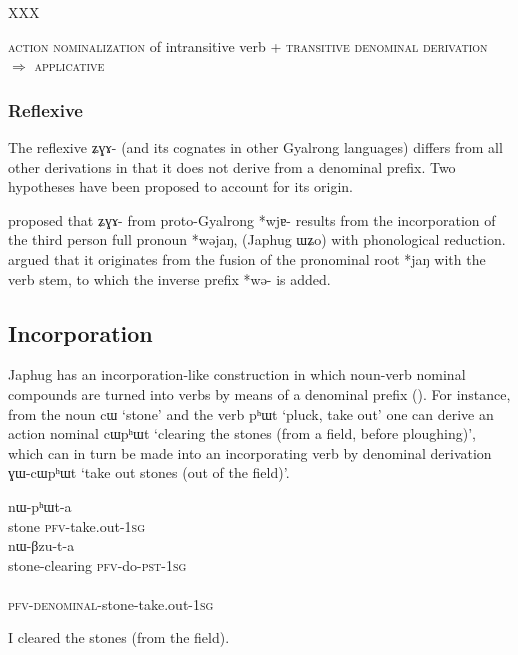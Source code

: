 \documentclass[oldfontcommands,oneside,a4paper,11pt]{article}
\newcommand{\ipa}[1]{{\phon #1}} %
\begin{document}
XXX

\begin{exe}
\ex \label{ex:pathway}
\glt \textsc{action nominalization} of intransitive verb + \textsc{transitive denominal derivation} $\Rightarrow$ \textsc{applicative}
\end{exe}

\subsubsection{Reflexive}
The reflexive \ipa{ʑɣɤ-} (and its cognates in other Gyalrong languages) differs from all other derivations in that it does not derive from a denominal prefix. Two hypotheses have been proposed to account for its origin. 

\citet{jacques10refl} proposed that \ipa{ʑɣɤ-} from proto-Gyalrong *\ipa{wjɐ-} results from the incorporation of the third person full pronoun *\ipa{wəjaŋ}, (Japhug \ipa{ɯʑo}) with phonological reduction. \citet{jackson14morpho} argued that it originates from the fusion of the pronominal root *\ipa{jaŋ} with the verb stem, to which the inverse prefix *\ipa{wə-} is added.


\subsection{Incorporation}
Japhug has an incorporation-like construction in which noun-verb nominal compounds are turned into verbs by means of a denominal prefix (\citealt{jacques12incorp}). For instance, from the noun \ipa{cɯ} `stone' and the verb \ipa{pʰɯt} `pluck, take out' one can derive an action nominal   \ipa{cɯpʰɯt} `clearing the stones (from a field, before ploughing)', which can in turn be made into an incorporating verb by denominal derivation  \ipa{ɣɯ-cɯpʰɯt } `take out stones (out of the field)'. 

\begin{exe}   
\ex
\begin{xlist}[(ii)]
\gll     \ipa{cɯ} \ipa{nɯ-pʰɯt-a}  \\
  stone \textsc{pfv}-take.out-\textsc{1sg} \\
\gll     \ipa{cɯ-pʰɯt} \ipa{nɯ-βzu-t-a}  \\
  stone-clearing \textsc{pfv}-do-\textsc{pst}-\textsc{1sg} \\
\gll     \ipa{nɯ-ɣɯ-cɯ-pʰɯt-a}  \\
  \textsc{pfv-denominal}-stone-take.out-\textsc{1sg} \\
  \end{xlist}
  \glt   I cleared the stones (from the field). 
\end{exe}   
\end{document}
